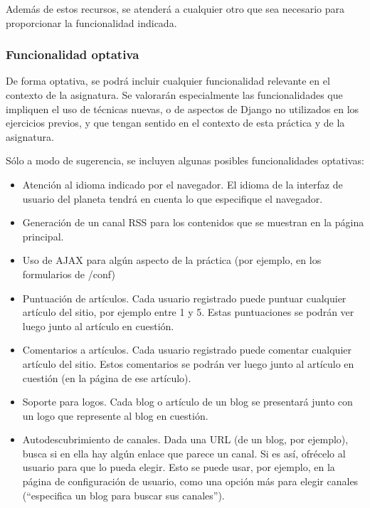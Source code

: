 Además de estos recursos, se atenderá a cualquier otro que sea necesario para proporcionar la funcionalidad indicada.


\subsubsection{Funcionalidad optativa}

De forma optativa, se podrá incluir cualquier funcionalidad relevante en el contexto de la asignatura. Se valorarán especialmente las funcionalidades que impliquen el uso de técnicas nuevas, o de aspectos de Django no utilizados en los ejercicios previos, y que tengan sentido en el contexto de esta práctica y de la asignatura.

Sólo a modo de sugerencia, se incluyen algunas posibles funcionalidades optativas:

\begin{itemize}
\item Atención al idioma indicado por el navegador. El idioma de la interfaz de usuario del planeta tendrá en cuenta lo que especifique el navegador.

\item Generación de un canal RSS para los contenidos que se muestran en la página principal.

\item Uso de AJAX para algún aspecto de la práctica (por ejemplo, en los formularios de /conf)

\item Puntuación de artículos. Cada usuario registrado puede puntuar cualquier artículo del sitio, por ejemplo entre 1 y 5. Estas puntuaciones se podrán ver luego junto al artículo en cuestión.

\item Comentarios a artículos. Cada usuario registrado puede comentar cualquier artículo del sitio. Estos comentarios se podrán ver luego junto al artículo en cuestión (en la página de ese artículo).

\item Soporte para logos. Cada blog o artículo de un blog se presentará junto con un logo que represente al blog en cuestión.

\item Autodescubrimiento de canales. Dada una URL (de un blog, por ejemplo), busca si en ella hay algún enlace que parece un canal. Si es así, ofrécelo al usuario para que lo pueda elegir. Esto se puede usar, por ejemplo, en la página de configuración de usuario, como una opción más para elegir canales (``especifica un blog para buscar sus canales'').
\end{itemize}


